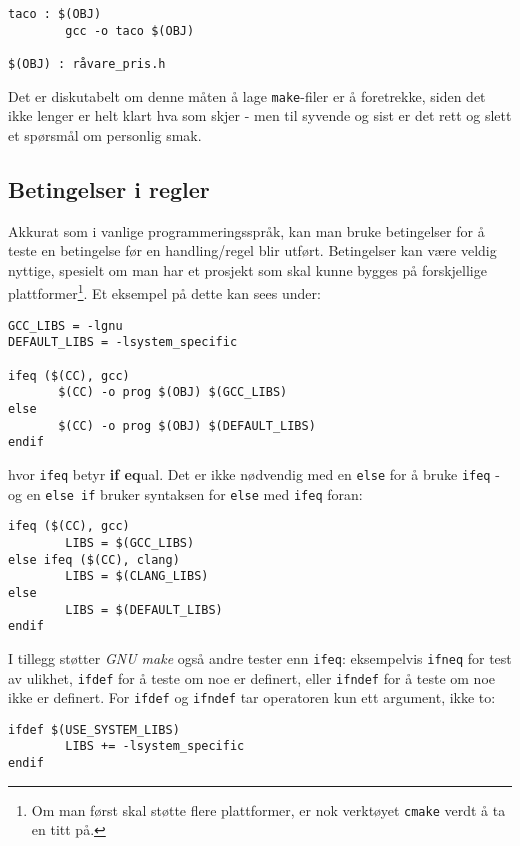 \begin{alphasection}
\begin{lstlisting}
taco : $(OBJ)
        gcc -o taco $(OBJ)
        
$(OBJ) : råvare_pris.h
\end{lstlisting}


Det er diskutabelt om denne måten å lage \verb|make|-filer er å foretrekke, siden
det ikke lenger er helt klart hva som skjer - men til syvende og sist er det
rett og slett et spørsmål om personlig smak.

\subsection{Betingelser i regler}

Akkurat som i vanlige programmeringsspråk, kan man bruke betingelser for å teste en betingelse før en handling/regel blir utført. Betingelser kan være veldig nyttige, spesielt om man har et prosjekt som skal kunne bygges på forskjellige plattformer\footnote{Om man først skal støtte flere plattformer, er nok verktøyet \texttt{cmake} verdt å ta en titt på.}. Et eksempel på dette kan sees under: 

\begin{verbatim}
GCC_LIBS = -lgnu
DEFAULT_LIBS = -lsystem_specific

ifeq ($(CC), gcc)
       $(CC) -o prog $(OBJ) $(GCC_LIBS)
else
       $(CC) -o prog $(OBJ) $(DEFAULT_LIBS)
endif
\end{verbatim}


hvor \verb|ifeq| betyr \textbf{if eq}ual. Det er ikke nødvendig med en \verb|else| for å bruke \verb|ifeq| - og en \verb|else if| bruker syntaksen for \verb|else| med \verb|ifeq| foran: 

\begin{lstlisting}
ifeq ($(CC), gcc)
        LIBS = $(GCC_LIBS)
else ifeq ($(CC), clang)
        LIBS = $(CLANG_LIBS)
else
        LIBS = $(DEFAULT_LIBS)
endif
\end{lstlisting}

I tillegg støtter \textit{GNU make} også andre tester enn \verb|ifeq|: eksempelvis \verb|ifneq| for test av ulikhet, \verb|ifdef| for å teste om noe er definert, eller \verb|ifndef| for å teste om noe ikke er definert. For \verb|ifdef| og \verb|ifndef| tar operatoren kun ett argument, ikke to:

\begin{lstlisting}
ifdef $(USE_SYSTEM_LIBS)
        LIBS += -lsystem_specific
endif
\end{lstlisting}

\end{alphasection}              


\setcounter{section}{0}